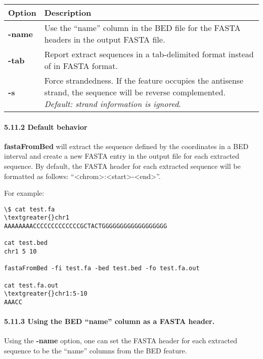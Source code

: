 \documentclass[letterpaper,10pt,english]{sphinxmanual}
\begin{document}
\begin{tabulary}{\linewidth}{|L|L|}
\hline
\textbf{
Option
} & \textbf{
Description
}\\\hline

\textbf{-name}
 & 
Use the ``name'' column in the BED file for the FASTA headers in the output FASTA file.
\\\hline

\textbf{-tab}
 & 
Report extract sequences in a tab-delimited format instead of in FASTA format.
\\\hline

\textbf{-s}
 & 
Force strandedness. If the feature occupies the antisense strand, the sequence will be reverse complemented. \emph{Default: strand information is ignored}.
\\\hline
\end{tabulary}



\paragraph{5.11.2 Default behavior}
\label{content/fastafromBed:default-behavior}
\textbf{fastaFromBed} will extract the sequence defined by the coordinates in a BED interval and create a
new FASTA entry in the output file for each extracted sequence. By default, the FASTA header for each
extracted sequence will be formatted as follows: ``\textless{}chrom\textgreater{}:\textless{}start\textgreater{}-\textless{}end\textgreater{}''.

For example:

\begin{Verbatim}[commandchars=\\\{\}]
\$ cat test.fa
\textgreater{}chr1
AAAAAAAACCCCCCCCCCCCCGCTACTGGGGGGGGGGGGGGGGGG

cat test.bed
chr1 5 10

fastaFromBed -fi test.fa -bed test.bed -fo test.fa.out

cat test.fa.out
\textgreater{}chr1:5-10
AAACC
\end{Verbatim}


\paragraph{5.11.3 Using the BED ``name'' column as a FASTA header.}
\label{content/fastafromBed:using-the-bed-name-column-as-a-fasta-header}
Using the \textbf{-name} option, one can set the FASTA header for each extracted sequence to be the ``name''
columns from the BED feature.
\end{document}
